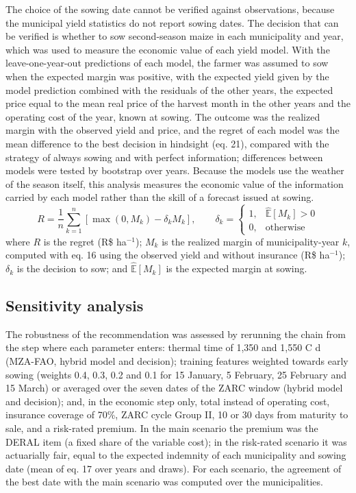 \documentclass[10pt,a4paper]{article}
\begin{document}
The choice of the sowing date cannot be verified against observations, because the municipal yield
statistics do not report sowing dates. The decision that can be verified is whether to sow second-season
maize in each municipality and year, which was used to measure the economic value of each yield model.
With the leave-one-year-out predictions of each model, the farmer was assumed to sow when the expected
margin was positive, with the expected yield given by the model prediction combined with the residuals of
the other years, the expected price equal to the mean real price of the harvest month in the other years
and the operating cost of the year, known at sowing. The outcome was the realized margin with the observed
yield and price, and the regret of each model was the mean difference to the best decision in hindsight
(eq. 21), compared with the strategy of always sowing and with perfect information; differences between
models were tested by bootstrap over years. Because the models use the weather of the season itself, this
analysis measures the economic value of the information carried by each model rather than the skill of
a forecast issued at sowing.
\begin{equation}
R = \frac{1}{n}\sum_{k=1}^{n}\left[\max(0, M_k) - \delta_k M_k\right], \qquad
\delta_k =
\begin{cases}
1, & \widehat{\mathbb{E}}[M_k] > 0\\
0, & \text{otherwise}
\end{cases}
\label{eq:regret}
\end{equation}
where $R$ is the regret (R\$ ha$^{-1}$); $M_k$ is the realized margin of municipality-year $k$, computed
with eq. 16 using the observed yield and without insurance (R\$ ha$^{-1}$); $\delta_k$ is the decision to sow;
and $\widehat{\mathbb{E}}[M_k]$ is the expected margin at sowing.

\subsection{Sensitivity analysis}
\label{subsec:sensitivity}

The robustness of the recommendation was assessed by rerunning the chain from the step where each
parameter enters: thermal time of 1,350 and 1,550 \textdegree{}C d (MZA-FAO, hybrid model and decision);
training features weighted towards early sowing (weights 0.4, 0.3, 0.2 and 0.1 for 15 January,
5 February, 25 February and 15 March) or averaged over the seven dates of the ZARC window (hybrid model and
decision); and, in the economic step only, total instead of operating cost, insurance coverage of 70\%,
ZARC cycle Group II, 10 or 30 days from maturity to sale, and a risk-rated premium. In the main scenario
the premium was the DERAL item (a fixed share of the variable cost); in the risk-rated scenario it was
actuarially fair, equal to the expected indemnity of each municipality and sowing date (mean of eq. 17
over years and draws). For each scenario, the agreement of the best date with the main scenario was
computed over the municipalities.
\end{document}
